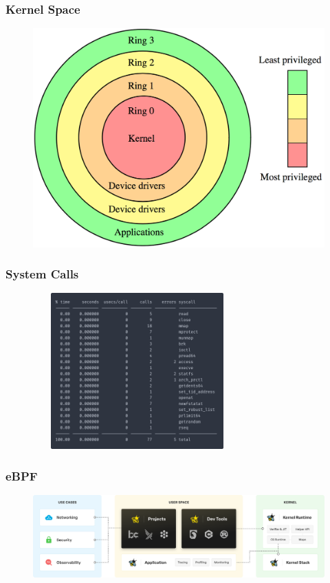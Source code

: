 \documentclass[pdflatex,compress]{beamer}
\begin{document}
\begin{frame}
\frametitle{Kernel Space}
\bigskip
\begin{figure}[t]
\includegraphics[scale=0.15]{images/kernel.png}
\centering
\end{figure}
\end{frame}

\begin{frame}
\frametitle{System Calls}
\bigskip
\begin{figure}[t]
\includegraphics[width=8cm, height=6cm]{images/strace2.png}
\centering
\end{figure}
\end{frame}

\begin{frame}
\frametitle{eBPF}

\begin{figure}[x]
\includegraphics[scale=0.25]{images/bpf.png}
\centering
\end{figure}
\end{frame}
\end{document}
